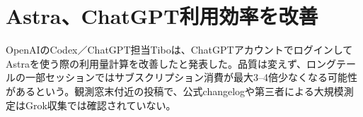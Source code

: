 \section{Astra、ChatGPT利用効率を改善}
OpenAIのCodex／ChatGPT担当Tiboは、ChatGPTアカウントでログインしてAstraを使う際の利用量計算を改善したと発表した。品質は変えず、ロングテールの一部セッションではサブスクリプション消費が最大3--4倍少なくなる可能性があるという。観測窓末付近の投稿で、公式changelogや第三者による大規模測定はGrok収集では確認されていない。
